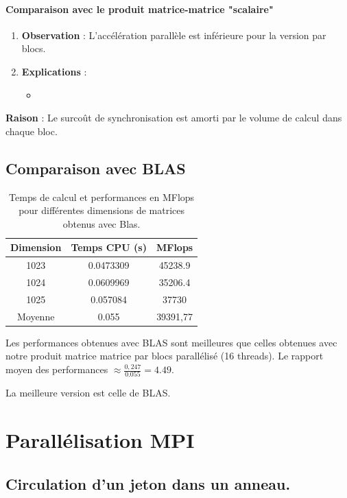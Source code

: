 \documentclass[a4paper,13pt]{book}
\begin{document}
\paragraph{Comparaison avec le produit matrice-matrice "scalaire"}
\begin{enumerate}
\item \textbf{ Observation} :
L'accélération parallèle est inférieure pour la version par blocs.
\item \textbf{Explications }:
    \begin{itemize}
        \item 
    \end{itemize}
\end{enumerate}
\textbf{Raison }:
Le surcoût de synchronisation est amorti par le volume de calcul dans chaque bloc.
 \subsection{Comparaison avec BLAS} 

 \begin{table}[h!]
    \begin{center}
    \begin{tabular}{|c|c|c|}
        \hline
        Dimension & Temps CPU (s) & MFlops \\ \hline
        1023      & 0.0473309       & 45238.9 \\ \hline
        1024      & 0.0609969       & 35206.4 \\ \hline
        1025      & 0.057084       & 37730 \\ \hline
        Moyenne & 0.055 & 39391,77 \\ \hline
    \end{tabular}
    \caption{Temps de calcul et performances en MFlops pour différentes dimensions de matrices obtenus avec Blas.}
    \label{tab:perf_matrix}
\end{center}
\end{table}
Les performances obtenues avec BLAS sont meilleures que celles obtenues avec notre produit matrice matrice par blocs parallélisé (16 threads). Le rapport moyen des performances $\approx \frac{0,247}{0.055} = 4.49$.

La meilleure version est celle de BLAS.
\section{Parallélisation MPI}
\subsection{Circulation d'un jeton dans un anneau.}
\end{document}

